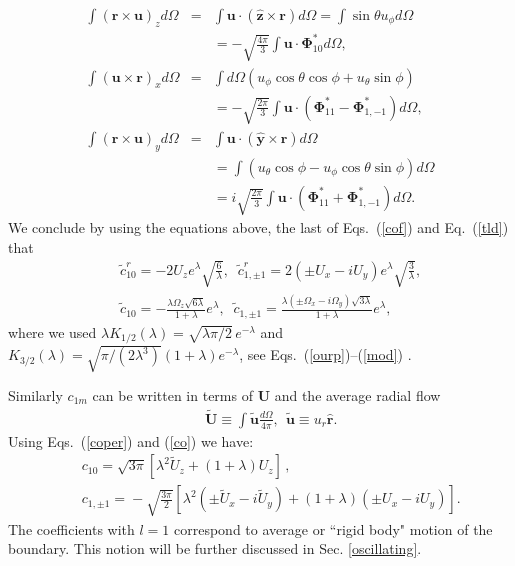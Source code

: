 \documentclass[aps,prx,twocolumn,amsmath,amssymb,amsfonts]{revtex4-2}
\begin{document}
\begin{eqnarray}
\int \!\!\left(\bm r\!\times\!\bm u\right)_z d\Omega\!&=&\!\int \!\!\bm u\!\cdot\!\left(\bm{\hat z}\!\times\!\bm r\right) d\Omega
\!=\!\int\!\! \sin\theta u_{\phi} d\Omega \nonumber \\
&& \!\!\!\!\!\!=-\sqrt{\frac{4\pi}{3}} \int \!\!\bm u\!\cdot \!\bm \Phi_{10}^*d\Omega, \nonumber \\
\int \!\!\left(\bm u\!\times\!\bm r\right)_x \!d\Omega\!&=&\!\!\!\int\!\! d\Omega\left(u_{\phi}\cos\theta\cos\phi\!+\!u_{\theta}\sin\phi\right)
\nonumber\\
&& \!\!\!\!\!\!\!=-\sqrt{\frac{2\pi}{3}}\int \bm u\cdot\left(\bm \Phi_{11}^*-\bm \Phi_{1, -1}^*\right) d\Omega, \nonumber \\
\int \left(\bm r\times\bm u\right)_y d\Omega &=& \int \bm u\cdot\left(\bm{\hat y}\times\bm r\right) d\Omega \nonumber \\
&& \!\!\!\!\!\!=\int \left(u_{\theta}\cos\phi-u_{\phi}\cos\theta\sin\phi\right) d\Omega
\nonumber\\
&& \!\!\!\!\!\!=i\sqrt{\frac{2\pi}{3}}\int \bm u\cdot\left(\bm \Phi_{11}^*+\bm \Phi_{1, -1}^*\right) d\Omega.
\end{eqnarray}
We conclude by using the equations above, the last of Eqs.~(\ref{cof}) and Eq.~(\ref{tld}) that
\begin{eqnarray}
&& {\tilde c}^{r}_{10}=- 2 U_z e^{\lambda}\sqrt{\frac{6}{\lambda}},\;\;  {\tilde c}^{r}_{1, \pm 1}=2\left(\pm U_x\!-\!iU_y\right)e^{\lambda}\sqrt{\frac{3}{\lambda}},\label{co} \\
&& {\tilde c}_{10}=-\frac{\lambda\Omega_z\sqrt{6\lambda}}{1+\lambda}e^{\lambda},\;\;  {\tilde c}_{1, \pm 1}=\frac{\lambda\left(\pm   \Omega_x\!-\!i\Omega_y\right)\sqrt{3\lambda}}{1+\lambda}e^{\lambda}, \nonumber
\end{eqnarray}
where we used $\lambda K_{1/2}(\lambda)=\sqrt{\lambda \pi/2}\,e^{-\lambda}$  and $K_{3/2}(\lambda)\!=\!\sqrt{\pi/(2\lambda^3)}(1+\lambda)e^{-\lambda}$, see Eqs.~(\ref{ourp})--(\ref{mod}) .

Similarly $c_{1m}$ can be written in terms of $\bm U$ and the average radial flow
\begin{eqnarray}&&
\tilde {\bm U} \equiv \int \tilde {\bm u}\frac{d\Omega}{4\pi},\ \ \tilde {\bm u}\equiv u_r \bm{\hat r}.
\end{eqnarray}
Using Eqs.~(\ref{coper}) and (\ref{co}) we have:
\begin{eqnarray}&&
c_{10}=\sqrt{3\pi}\left[\lambda^2 {\tilde U}_z+(1+\lambda)U_z\right]\,,
\\&&
c_{1, \pm 1}\!=\!-\sqrt{\frac{3\pi}{2}} \left[ \lambda^2(\pm {\tilde U}_x- i{\tilde U}_y)\!+\!(1+\lambda)(\pm U_x- iU_y)\right].\nonumber
\end{eqnarray}
The coefficients with $l\!=\!1$ correspond to average or ``rigid body" motion of the boundary. This notion will be further discussed in Sec. \ref{oscillating}.
\end{document}
